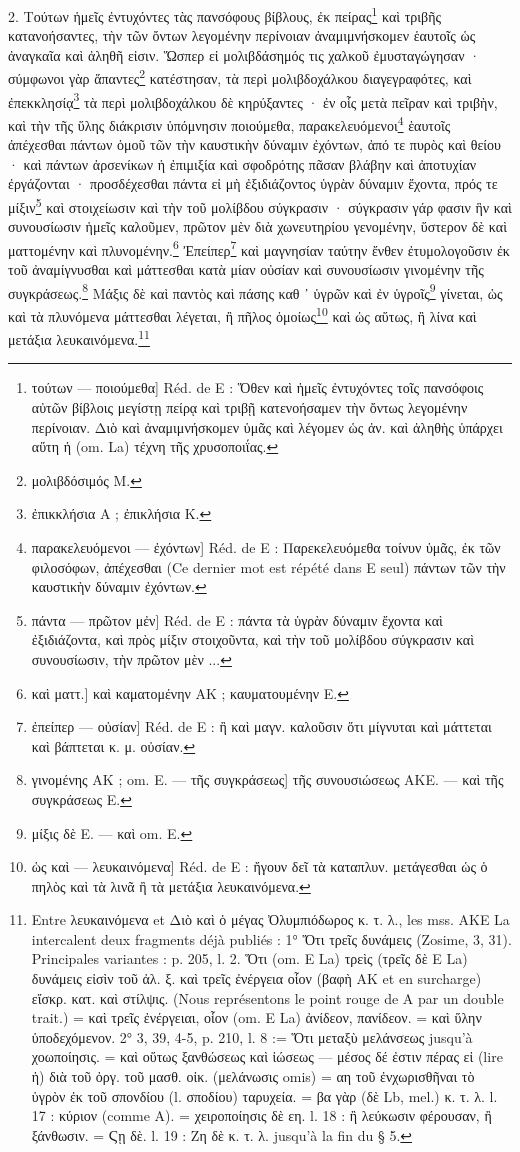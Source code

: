 \documentclass[a4paper, 11pt, oneside, polutonikogreek, french]{article}
\begin{document}
2. Τούτων ἡμεῖς ἐντυχόντες τὰς πανσόφους βίβλους, ἐκ πείρας\footnote{τούτων --- ποιούμεθα] Réd. de E : Ὅθεν καὶ ἡμεῖς ἐντυχόντες τοῖς πανσόφοις αὐτῶν βίβλοις μεγίστῃ πείρᾳ καὶ τριβῇ κατενοήσαμεν τὴν ὄντως λεγομένην περίνοιαν. Διὸ καὶ ἀναμιμνήσκομεν ὑμᾶς καὶ λέγομεν ὡς ἀν. καὶ ἀληθὴς ὑπάρχει αὕτη ἡ (om. La) τέχνη τῆς χρυσοποιΐας.} καὶ τριβῆς κατανοήσαντες, τὴν τῶν ὄντων λεγομένην περίνοιαν ἀναμιμνήσκομεν ἑαυτοῖς ὡς ἀναγκαῖα καὶ ἀληθῆ εἰσιν. Ὥσπερ εἰ μολιβδάσημός τις χαλκοῦ ἐμυσταγώγησαν · σύμφωνοι γὰρ ἅπαντες\footnote{μολιβδόσιμός M.} κατέστησαν, τὰ περὶ μολιβδοχάλκου διαγεγραφότες, καὶ ἐπεκκλησίᾳ\footnote{ἐπικκλήσια A ; ἐπικλήσια K.} τὰ περὶ μολιβδοχάλκου δὲ κηρύξαντες · ἐν οἷς μετὰ πεῖραν καὶ τριβὴν, καὶ τὴν τῆς ὕλης διάκρισιν ὑπόμνησιν ποιούμεθα, παρακελευόμενοι\footnote{παρακελευόμενοι --- ἐχόντων] Réd. de E : Παρεκελευόμεθα τοίνυν ὑμᾶς, ἐκ τῶν φιλοσόφων, ἀπέχεσθαι (Ce dernier mot est répété dans E seul) πάντων τῶν τὴν καυστικὴν δύναμιν ἐχόντων.} ἑαυτοῖς ἀπέχεσθαι πάντων ὁμοῦ τῶν τὴν καυστικὴν δύναμιν ἐχόντων, ἀπό τε πυρὸς καὶ θείου · καὶ πάντων ἀρσενίκων ἡ ἐπιμιξία καὶ σφοδρότης πᾶσαν βλάβην καὶ ἀποτυχίαν ἐργάζονται · προσδέχεσθαι πάντα εἰ μὴ ἐξιδιάζοντος ὑγρὰν δύναμιν ἔχοντα, πρός τε μίξιν\footnote{πάντα --- πρῶτον μἐν] Réd. de E : πάντα τὰ ὑγρὰν δύναμιν ἔχοντα καὶ ἐξιδιάζοντα, καὶ πρὸς μίξιν στοιχοῦντα, καὶ τὴν τοῦ μολίβδου σύγκρασιν καὶ συνουσίωσιν, τὴν πρῶτον μὲν ...} καὶ στοιχείωσιν καὶ τὴν τοῦ μολίβδου σύγκρασιν · σύγκρασιν γάρ φασιν ἣν καὶ συνουσίωσιν ἡμεῖς καλοῦμεν, πρῶτον μὲν διὰ χωνευτηρίου γενομένην, ὕστερον δὲ καὶ ματτομένην καὶ πλυνομένην.\footnote{καὶ ματτ.] καὶ καματομένην AΚ ; καυματουμένην E.} Ἐπείπερ\footnote{ἐπείπερ --- οὐσίαν] Réd. de E : ἢ καὶ μαγν. καλοῦσιν ὅτι μίγνυται καὶ μάττεται καὶ βάπτεται κ. μ. οὐσίαν.} καὶ μαγνησίαν ταύτην ἔνθεν ἐτυμολογοῦσιν ἐκ τοῦ ἀναμίγνυσθαι καὶ μάττεσθαι κατὰ μίαν οὐσίαν καὶ συνουσίωσιν γινομένην τῆς συγκράσεως.\footnote{γινομένης AK ; om. E. --- τῆς συγκράσεως] τῆς συνουσιώσεως AKE. --- καὶ τῆς συγκράσεως E.} Μάξις δὲ καὶ παντὸς καὶ πάσης καθ ᾽ ὑγρῶν καὶ ἐν ὑγροῖς\footnote{μίξις δὲ E. --- καὶ om. E.} γίνεται, ὡς καὶ τὰ πλυνόμενα μάττεσθαι λέγεται, ἢ πῆλος ὁμοίως\footnote{ὡς καὶ --- λευκαινόμενα] Réd. de E : ἤγουν δεῖ τὰ καταπλυν. μετάγεσθαι ὡς ὁ πηλὸς καὶ τὰ λινᾶ ἢ τὰ μετάξια λευκαινόμενα.} καὶ ὡς αὕτως, ἢ λίνα καὶ μετάξια λευκαινόμενα.\footnote{Entre λευκαινόμενα et Διὸ καὶ ὁ μέγας Ὀλυμπιόδωρος κ. τ. λ., les mss. AKE La intercalent deux fragments déjà publiés : 1° Ὅτι τρεῖς δυνάμεις (Zosime, 3, 31). Principales variantes : p. 205, l. 2. Ὅτι (om. E La) τρεὶς (τρεῖς δὲ E La) δυνάμεις εἰσὶν τοῦ ἀλ. ξ. καὶ τρεῖς ἐνέργεια οἷον (βαφὴ AK et en surcharge) εἴσκρ. κατ. καὶ στίλψις. (Nous représentons le point rouge de A par un double trait.) = καὶ τρεῖς ἐνέργειαι, οἷον (om. E La) ἀνίδεον, πανίδεον. = καὶ ὕλην ὑποδεχόμενον. 2° 3, 39, 4-5, p. 210, l. 8 := Ὅτι μεταξὺ μελάνσεως jusqu'à χοωποίησις. = καὶ οὕτως ξανθώσεως καὶ ἰώσεως --- μέσος δέ ἐστιν πέρας εἰ (lire ἡ) διὰ τοῦ ὀργ. τοῦ μασθ. οἰκ. (μελάνωσις omis) = αη τοῦ ἐνχωρισθῆναι τὸ ὑγρὸν ἐκ τοῦ σπονδίου (l. σποδίου) ταρυχεία. = βα γὰρ (δὲ Lb, mel.) κ. τ. λ. l. 17 : κύριον (comme A). = χειροποίησις δὲ εη. l. 18 : ἢ λεύκωσιν φέρουσαν, ἢ ξάνθωσιν. = Ϛῃ δὲ. l. 19 : Ζη δὲ κ. τ. λ. jusqu'à la fin du § 5.}
\end{document}
